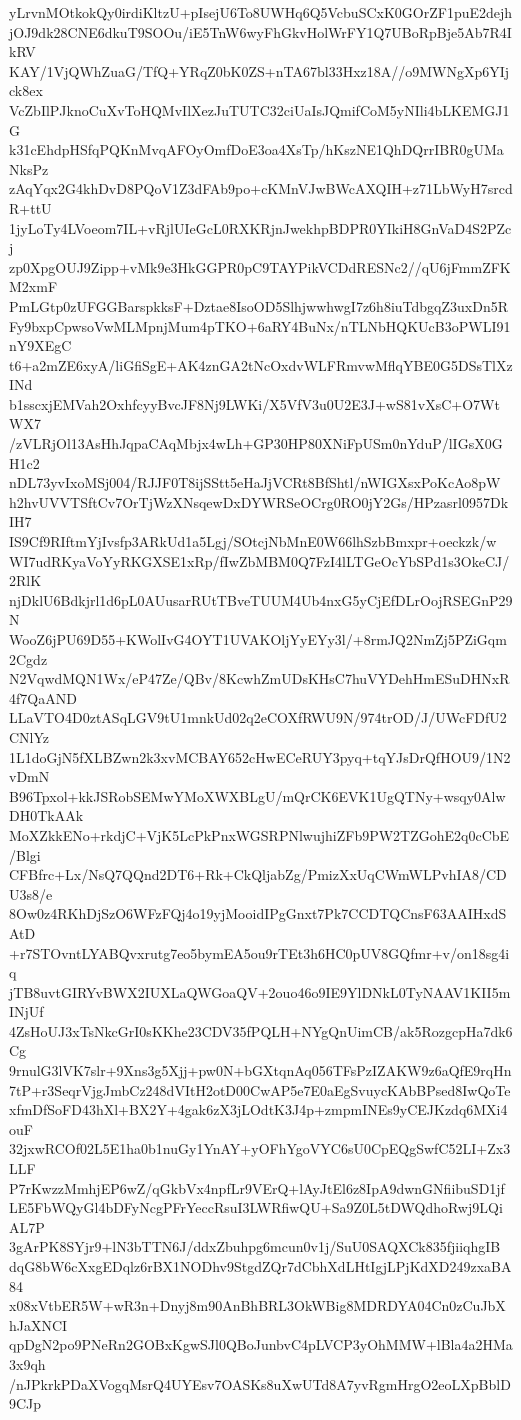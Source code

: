 yLrvnMOtkokQy0irdiKltzU+pIsejU6To8UWHq6Q5VcbuSCxK0GOrZF1puE2dejh
jOJ9dk28CNE6dkuT9SOOu/iE5TnW6wyFhGkvHolWrFY1Q7UBoRpBje5Ab7R4IkRV
KAY/1VjQWhZuaG/TfQ+YRqZ0bK0ZS+nTA67bl33Hxz18A//o9MWNgXp6YIjck8ex
VcZbIlPJknoCuXvToHQMvIlXezJuTUTC32ciUaIsJQmifCoM5yNIli4bLKEMGJ1G
k31cEhdpHSfqPQKnMvqAFOyOmfDoE3oa4XsTp/hKszNE1QhDQrrIBR0gUMaNksPz
zAqYqx2G4khDvD8PQoV1Z3dFAb9po+cKMnVJwBWcAXQIH+z71LbWyH7srcdR+ttU
1jyLoTy4LVoeom7IL+vRjlUIeGcL0RXKRjnJwekhpBDPR0YIkiH8GnVaD4S2PZcj
zp0XpgOUJ9Zipp+vMk9e3HkGGPR0pC9TAYPikVCDdRESNc2//qU6jFmmZFKM2xmF
PmLGtp0zUFGGBarspkksF+Dztae8IsoOD5SlhjwwhwgI7z6h8iuTdbgqZ3uxDn5R
Fy9bxpCpwsoVwMLMpnjMum4pTKO+6aRY4BuNx/nTLNbHQKUcB3oPWLI91nY9XEgC
t6+a2mZE6xyA/liGfiSgE+AK4znGA2tNcOxdvWLFRmvwMflqYBE0G5DSsTlXzINd
b1sscxjEMVah2OxhfcyyBvcJF8Nj9LWKi/X5VfV3u0U2E3J+wS81vXsC+O7WtWX7
/zVLRjOl13AsHhJqpaCAqMbjx4wLh+GP30HP80XNiFpUSm0nYduP/lIGsX0GH1c2
nDL73yvIxoMSj004/RJJF0T8ijSStt5eHaJjVCRt8BfShtl/nWIGXsxPoKcAo8pW
h2hvUVVTSftCv7OrTjWzXNsqewDxDYWRSeOCrg0RO0jY2Gs/HPzasrl0957DkIH7
IS9Cf9RIftmYjIvsfp3ARkUd1a5Lgj/SOtcjNbMnE0W66lhSzbBmxpr+oeckzk/w
WI7udRKyaVoYyRKGXSE1xRp/fIwZbMBM0Q7FzI4lLTGeOcYbSPd1s3OkeCJ/2RlK
njDklU6Bdkjrl1d6pL0AUusarRUtTBveTUUM4Ub4nxG5yCjEfDLrOojRSEGnP29N
WooZ6jPU69D55+KWolIvG4OYT1UVAKOljYyEYy3l/+8rmJQ2NmZj5PZiGqm2Cgdz
N2VqwdMQN1Wx/eP47Ze/QBv/8KcwhZmUDsKHsC7huVYDehHmESuDHNxR4f7QaAND
LLaVTO4D0ztASqLGV9tU1mnkUd02q2eCOXfRWU9N/974trOD/J/UWcFDfU2CNlYz
1L1doGjN5fXLBZwn2k3xvMCBAY652cHwECeRUY3pyq+tqYJsDrQfHOU9/1N2vDmN
B96Tpxol+kkJSRobSEMwYMoXWXBLgU/mQrCK6EVK1UgQTNy+wsqy0AlwDH0TkAAk
MoXZkkENo+rkdjC+VjK5LcPkPnxWGSRPNlwujhiZFb9PW2TZGohE2q0cCbE/Blgi
CFBfrc+Lx/NsQ7QQnd2DT6+Rk+CkQljabZg/PmizXxUqCWmWLPvhIA8/CDU3s8/e
8Ow0z4RKhDjSzO6WFzFQj4o19yjMooidIPgGnxt7Pk7CCDTQCnsF63AAIHxdSAtD
+r7STOvntLYABQvxrutg7eo5bymEA5ou9rTEt3h6HC0pUV8GQfmr+v/on18sg4iq
jTB8uvtGIRYvBWX2IUXLaQWGoaQV+2ouo46o9IE9YlDNkL0TyNAAV1KII5mINjUf
4ZsHoUJ3xTsNkcGrI0sKKhe23CDV35fPQLH+NYgQnUimCB/ak5RozgcpHa7dk6Cg
9rnulG3lVK7slr+9Xns3g5Xjj+pw0N+bGXtqnAq056TFsPzIZAKW9z6aQfE9rqHn
7tP+r3SeqrVjgJmbCz248dVItH2otD00CwAP5e7E0aEgSvuycKAbBPsed8IwQoTe
xfmDfSoFD43hXl+BX2Y+4gak6zX3jLOdtK3J4p+zmpmINEs9yCEJKzdq6MXi4ouF
32jxwRCOf02L5E1ha0b1nuGy1YnAY+yOFhYgoVYC6sU0CpEQgSwfC52LI+Zx3LLF
P7rKwzzMmhjEP6wZ/qGkbVx4npfLr9VErQ+lAyJtEl6z8IpA9dwnGNfiibuSD1jf
LE5FbWQyGl4bDFyNcgPFrYeccRsuI3LWRfiwQU+Sa9Z0L5tDWQdhoRwj9LQiAL7P
3gArPK8SYjr9+lN3bTTN6J/ddxZbuhpg6mcun0v1j/SuU0SAQXCk835fjiiqhgIB
dqG8bW6cXxgEDqlz6rBX1NODhv9StgdZQr7dCbhXdLHtIgjLPjKdXD249zxaBA84
x08xVtbER5W+wR3n+Dnyj8m90AnBhBRL3OkWBig8MDRDYA04Cn0zCuJbXhJaXNCI
qpDgN2po9PNeRn2GOBxKgwSJl0QBoJunbvC4pLVCP3yOhMMW+lBla4a2HMa3x9qh
/nJPkrkPDaXVogqMsrQ4UYEsv7OASKs8uXwUTd8A7yvRgmHrgO2eoLXpBblD9CJp
